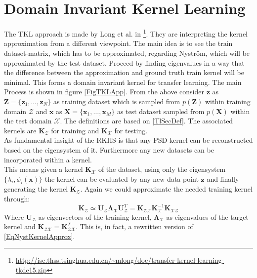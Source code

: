 \section{Domain Invariant Kernel Learning}\label{InSecTrans}
The \ac{TKL} approach is made by Long et al. in  \cite{Long.2015}\footnote{\url{http://ise.thss.tsinghua.edu.cn/~mlong/doc/transfer-kernel-learning-tkde15.zip}}.
They are interpreting the kernel approximation from a different viewpoint.
The main idea is to see the train dataset-matrix, which has to be approximated, regarding Nyström, which will be approximated by the test dataset. Proceed by finding eigenvalues in a way that the difference between the approximation and ground truth train kernel will be minimal. This forms a domain invariant kernel for transfer learning.\cite{Long.2015}
The main Process is shown in figure \ref{FigTKLApp}.\newline 
From the above consider $\mathbf{z}$ as $\mathbf{Z}=\{\mathbf{z}_1,\dots,\mathbf{z}_{N}\}$ as training dataset which is sampled from $p(\mathbf{Z})$ within training domain $\mathcal{Z}$ and $\mathbf{x}$ as $\mathbf{X}=\{\mathbf{x}_1,\dots,\mathbf{x}_{M}\}$ as test dataset sampled from $p(\mathbf{X})$ within the test domain $\mathcal{X}$.
The definitions are based on \ref{TlSecDef}.
The associated kernels are $\mathbf{K}_\mathcal{Z}$ for training and $\mathbf{K}_\mathcal{X}$ for testing.\\
As fundamental insight of the \acs{RKHS} is that any \ac{PSD} kernel can be reconstructed based on the eigensystem of it. Furthermore any new datasets can be incorporated within a kernel.\cite{Long.2015}\\
This means given a kernel $\mathbf{K}_\mathcal{X}$ of the dataset, using only the eigensystem $\{\lambda_i,\phi_i(\mathbf{x})\}$ the kernel can be evaluated by any new data point $\mathbf{z}$ and finally generating the kernel $\mathbf{K}_\mathcal{Z}$.
Again we could approximate the needed training kernel through:\cite{Long.2015}
\begin{equation}\label{EqTrainTestApprox}
	\mathbf{K}_\mathcal{Z} \simeq \mathbf{U}_\mathcal{Z}\boldsymbol{\Lambda}_\mathcal{X} \mathbf{U}_\mathcal{Z}^T = \mathbf{K}_\mathcal{ZX}\mathbf{K}_\mathcal{X}^{-1}\mathbf{K}_\mathcal{XZ}
\end{equation}
Where $\mathbf{U}_\mathcal{Z}$ as eigenvectors of the training kernel, $\boldsymbol{\Lambda}_\mathcal{X}$ as eigenvalues of the target kernel and $\mathbf{K}_\mathcal{ZX} = \mathbf{K}_\mathcal{ZX}^T$.
This is, in fact, a rewritten version of \eqref{EqNystKernelApprox}.\\
